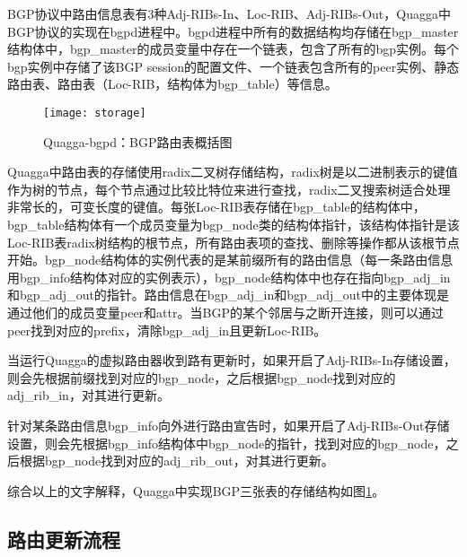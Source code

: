 BGP协议中路由信息表有3种Adj-RIBs-In、Loc-RIB、Adj-RIBs-Out，Quagga中BGP协议的实现在bgpd进程中。bgpd进程中所有的数据结构均存储在bgp\_master结构体中，bgp\_master的成员变量中存在一个链表，包含了所有的bgp实例。每个bgp实例中存储了该BGP session的配置文件、一个链表包含所有的peer实例、静态路由表、路由表（Loc-RIB，结构体为bgp\_table）等信息。


\begin{figure}
  \centering
  \texttt{[image: storage]}
  \caption{Quagga-bgpd：BGP路由表概括图\cite{jakma2014quagga}}
  \label{fig:storage}
\end{figure}

Quagga中路由表的存储使用radix二叉树\cite{quaggaThesis}存储结构，radix树是以二进制表示的键值作为树的节点，每个节点通过比较比特位来进行查找，radix二叉搜索树适合处理非常长的，可变长度的键值。每张Loc-RIB表存储在bgp\_table的结构体中，bgp\_table结构体有一个成员变量为bgp\_node类的结构体指针，该结构体指针是该Loc-RIB表radix树结构的根节点，所有路由表项的查找、删除等操作都从该根节点开始。bgp\_node结构体的实例代表的是某前缀所有的路由信息（每一条路由信息用bgp\_info结构体对应的实例表示），bgp\_node结构体中也存在指向bgp\_adj\_in和bgp\_adj\_out的指针。路由信息在bgp\_adj\_in和bgp\_adj\_out中的主要体现是通过他们的成员变量peer和attr。当BGP的某个邻居与之断开连接，则可以通过peer找到对应的prefix，清除bgp\_adj\_in且更新Loc-RIB。

当运行Quagga的虚拟路由器收到路有更新时，如果开启了Adj-RIBs-In存储设置，则会先根据前缀找到对应的bgp\_node，之后根据bgp\_node找到对应的adj\_rib\_in，对其进行更新。

针对某条路由信息bgp\_info向外进行路由宣告时，如果开启了Adj-RIBs-Out存储设置，则会先根据bgp\_info结构体中bgp\_node的指针，找到对应的bgp\_node，之后根据bgp\_node找到对应的adj\_rib\_out，对其进行更新。

综合以上的文字解释，Quagga中实现BGP三张表的存储结构如图\ref{fig:storage}。
\subsection{路由更新流程}


